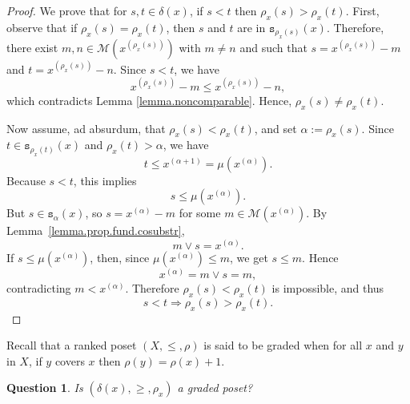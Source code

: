 \documentclass{article}
\newtheorem{question}[theorem]{Question}
\begin{document}
\begin{proof}
    We prove that for $s,t \in \delta(x)$, if $s < t$
    then $\rho_x(s) > \rho_x(t)$. 
    {First, observe that if \(\rho_x(s)=\rho_x(t)\), then \(s\) and \(t\) are in \(\texttt{s}_{\rho_x(s)}(x)\). Therefore, there exist \(m,n\in\mathcal{M}(x^{(\rho_x(s))})\) with \(m\neq n\) and such that \(s=x^{(\rho_x(s))}-m\) and \(t=x^{(\rho_x(s))}-n\). {Since \(s< t\), we have
    \[x^{(\rho_x(s))}-m\leq x^{(\rho_x(s))}-n,\]
    which contradicts Lemma \ref{lemma.noncomparable}.}
    Hence, \(\rho_x(s)\neq\rho_x(t)\).}
    
    Now assume, ad absurdum, that $\rho_x(s)<\rho_x(t)$, and set
    $\alpha:=\rho_x(s)$. Since $t\in \texttt{s}_{\rho_x(t)}(x)$ and
    $\rho_x(t)>\alpha$, we have
    \[
        t\le x^{(\alpha+1)}=\mu(x^{(\alpha)}).
    \]
    Because $s<t$, this implies
    \[
        s\le \mu(x^{(\alpha)}).
    \]
    But $s\in \texttt{s}_\alpha(x)$, so $s=x^{(\alpha)}-m$ for some
    $m\in\mathcal M(x^{(\alpha)})$. By Lemma~\ref{lemma.prop.fund.cosubstr},
    \[
        m\vee s=x^{(\alpha)}.
    \]
    If $s\le \mu(x^{(\alpha)})$, then, since $\mu(x^{(\alpha)})\le m$, we get $s\le m$. Hence
    \[
        x^{(\alpha)}=m\vee s=m,
    \]
    contradicting $m<x^{(\alpha)}$. Therefore $\rho_x(s)<\rho_x(t)$ is impossible,
    and thus
    \[
        s<t \Longrightarrow \rho_x(s)>\rho_x(t).
    \]
\end{proof}

{Recall that a ranked poset $(X,\le,\rho)$ is said to be graded when 
for all $x$ and $y$ in $X$, if $y$ covers $x$ then $\rho(y) = \rho(x) +1$.}

\begin{question}
    Is $(\delta(x),\ge,\rho_x)$ a graded poset?
\end{question}
\end{document}
